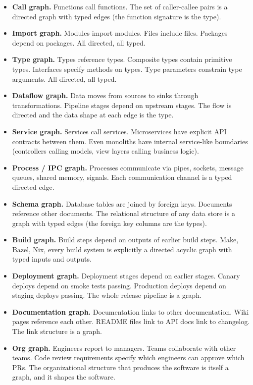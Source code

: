 \documentclass[11pt]{article}
\begin{document}
\begin{itemize}[leftmargin=*]
\item \textbf{Call graph.} Functions call functions. The set of caller-callee pairs is a directed graph with typed edges (the function signature is the type).
\item \textbf{Import graph.} Modules import modules. Files include files. Packages depend on packages. All directed, all typed.
\item \textbf{Type graph.} Types reference types. Composite types contain primitive types. Interfaces specify methods on types. Type parameters constrain type arguments. All directed, all typed.
\item \textbf{Dataflow graph.} Data moves from sources to sinks through transformations. Pipeline stages depend on upstream stages. The flow is directed and the data shape at each edge is the type.
\item \textbf{Service graph.} Services call services. Microservices have explicit API contracts between them. Even monoliths have internal service-like boundaries (controllers calling models, view layers calling business logic).
\item \textbf{Process / IPC graph.} Processes communicate via pipes, sockets, message queues, shared memory, signals. Each communication channel is a typed directed edge.
\item \textbf{Schema graph.} Database tables are joined by foreign keys. Documents reference other documents. The relational structure of any data store is a graph with typed edges (the foreign key columns are the types).
\item \textbf{Build graph.} Build steps depend on outputs of earlier build steps. Make, Bazel, Nix, every build system is explicitly a directed acyclic graph with typed inputs and outputs.
\item \textbf{Deployment graph.} Deployment stages depend on earlier stages. Canary deploys depend on smoke tests passing. Production deploys depend on staging deploys passing. The whole release pipeline is a graph.
\item \textbf{Documentation graph.} Documentation links to other documentation. Wiki pages reference each other. README files link to API docs link to changelog. The link structure is a graph.
\item \textbf{Org graph.} Engineers report to managers. Teams collaborate with other teams. Code review requirements specify which engineers can approve which PRs. The organizational structure that produces the software is itself a graph, and it shapes the software.
\end{itemize}
\end{document}
